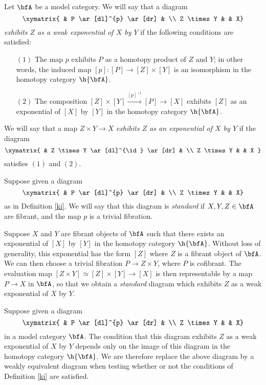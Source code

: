 \begin{Simplicial Categories}
\begin{definition}\label{ki}
Let $\bfA$ be a model category. We will say that a diagram
$$ \xymatrix{ &  P \ar[dl]^{p} \ar[dr] & \\
Z \times Y & & X}$$
{\it exhibits $Z$ as a weak exponential of $X$ by $Y$} if the following conditions are satisfied:
\begin{itemize}
\item[$(1)$] The map $p$ exhibits $P$ as a homotopy product of $Z$ and $Y$; in other words,
the induced map $[p]: [P] \rightarrow [Z] \times [Y]$ is an isomorphism in the homotopy category
$\h{\bfA}$. 
\item[$(2)$] The composition
$[Z] \times [Y] \stackrel{ [p]^{-1} }{\rightarrow} [P] \rightarrow [X]$
exhibits $[Z]$ as an exponential of $[X]$ by $[Y]$ in the homotopy category $\h{\bfA}$.
\end{itemize}

We will say that a map $Z \times Y \rightarrow X$ {\it exhibits $Z$ as an exponential of
$X$ by $Y$} if the diagram
$$ \xymatrix{ & Z \times Y \ar[dl]^{\id} \ar[dr] & \\
Z \times Y & & X }$$
satisfies $(1)$ and $(2)$.
\end{definition}

\begin{remark}
Suppose given a diagram
$$ \xymatrix{ & P \ar[dl]^{p} \ar[dr] &  \\
Z \times Y & & X}$$
as in Definition \ref{ki}. We will say that this diagram is {\em standard} if
$X, Y, Z \in \bfA$ are fibrant, and the map $p$ is a trivial fibration.

Suppose $X$ and $Y$ are fibrant objects of $\bfA$ such that there exists an exponential
of $[X]$ by $[Y]$ in the homotopy category $\h{\bfA}$. Without loss of generality, this
exponential has the form $[Z]$ where $Z$ is a fibrant object of $\bfA$. We can then
choose a trivial fibration $P \rightarrow Z \times Y$, where $P$ is cofibrant. The evaluation
map $[Z \times Y] \simeq [Z] \times [Y] \rightarrow [X]$ is then representable by
a map $P \rightarrow X$ in $\bfA$, so that we obtain a {\em standard} diagram which exhibits
$Z$ as a weak exponential of $X$ by $Y$.
\end{remark}

\begin{remark}
Suppose given a diagram
$$ \xymatrix{ & P \ar[dl]^{p} \ar[dr] & \\
Z \times Y & & X}$$
in a model category $\bfA$. The condition that this diagram exhibits
$Z$ as a weak exponential of $X$ by $Y$ depends only on the image of this diagram
in the homotopy category $\h{\bfA}$. We are therefore replace the above diagram by a weakly equivalent diagram when testing whether or not the conditions of Definition \ref{ki} are satisfied.
\end{remark}


\end{Simplicial Categories}
